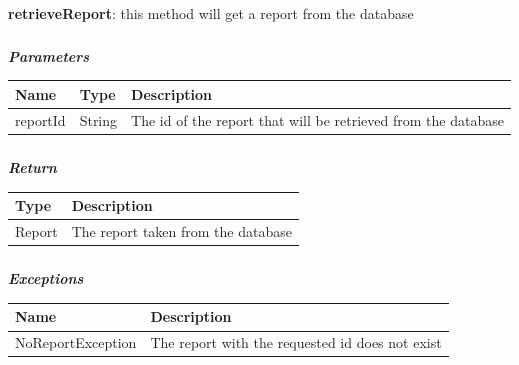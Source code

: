 						\paragraph{}
							\textbf{retrieveReport}: this method will get a report from the database
							\subparagraph{}
							\textit{\textbf{Parameters}}
							\vspace{-2mm}
								\begin{table}[!h]
									\begin{tabular}{L{0.15\textwidth}L{0.15\textwidth}L{0.5\textwidth}}
										\toprule
										\textbf{Name} & \textbf{Type} & Description \\
										\midrule
								  		reportId & String & The id of the report that will be retrieved from the database \\
								 		\bottomrule
									\end{tabular}
								\end{table}
							\vspace{-6mm}
							\subparagraph{}
								\textit{\textbf{Return}}
								\vspace{-2mm}
									\begin{table}[!h]
									\begin{tabular}{L{0.2\textwidth}L{0.6\textwidth}}
										\toprule
										Type & Description \\
										\midrule
										Report & The report taken from the database \\
								 		\bottomrule
									\end{tabular}
								\end{table}
							\vspace{-6mm}
							\subparagraph{}
								\textit{\textbf{Exceptions}}
								\vspace{-2mm}
									\begin{table}[!h]
									\begin{tabular}{ll}
										\toprule
										\textbf{Name} & \textbf{Description} \\
										\midrule
								  		NoReportException & The report with the requested id does not exist \\ 
								 		\bottomrule
									\end{tabular}
								\end{table}
						
